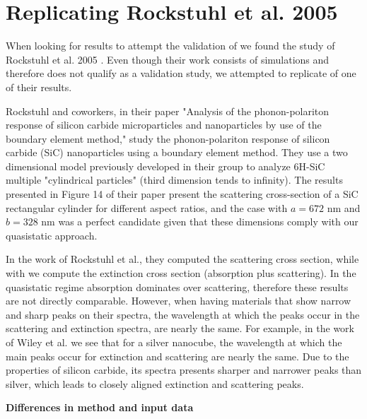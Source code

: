 
\section{Replicating Rockstuhl et al. 2005} \label{sec:rep_rockstuhl}
\graphicspath{{replication_validation/figs/}}

When looking for results to attempt the validation of \pygbe we found the study of Rockstuhl et al. 2005 \cite{rockstuhl2005}. 
Even though their work consists of simulations and therefore does not qualify as a validation study, we 
attempted to replicate of one of their results. 

Rockstuhl and coworkers, in their paper "Analysis of the phonon-polariton response of silicon carbide microparticles 
and nanoparticles by use of the boundary element method," study the phonon-polariton response of silicon carbide (SiC)
nanoparticles using a boundary element method. They use a two dimensional model previously developed in their group \cite{rockstuhl2003}
to analyze 6H-SiC multiple "cylindrical particles" (third dimension tends to infinity). The results presented in Figure 14 of their paper  
present the scattering cross-section of a SiC rectangular cylinder for different aspect ratios, and the case with $a = 672$ nm and $b = 328$ nm
was a perfect candidate given that these dimensions comply with our quasistatic approach.

In the work of Rockstuhl et al., they computed the scattering cross section, while with \pygbe we compute the extinction cross section 
(absorption plus scattering). In the quasistatic regime absorption dominates over scattering, therefore these results are not directly
comparable. However, when having materials that show narrow and sharp peaks on their spectra, the wavelength at which the peaks occur 
in the scattering and extinction spectra, are nearly the same. For example, in the work of Wiley et al. \cite{wiley-etal-2006}
we see that for a silver nanocube, the wavelength at which the main peaks occur for extinction and scattering are nearly the same. Due to the properties 
of silicon carbide, its spectra presents sharper and narrower peaks than silver, which leads to closely aligned extinction and scattering peaks.

\textbf{Differences in method and input data}

